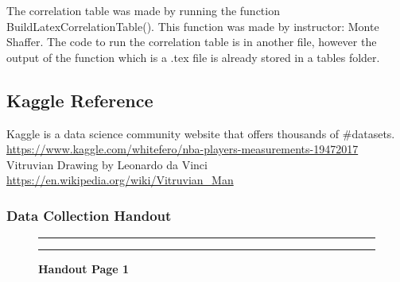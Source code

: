 \documentclass[]{article}
\begin{document}
The correlation table was made by running the function
BuildLatexCorrelationTable(). This function was made by instructor:
Monte Shaffer. The code to run the correlation table is in another file,
however the output of the function which is a .tex file is already
stored in a tables folder. \newline \newline

\subsection{Kaggle Reference}
\label{sec:References}

Kaggle is a data science community website that offers thousands of
\#datasets. \newline
\url{https://www.kaggle.com/whitefero/nba-players-measurements-19472017}
\newline \vspace{2.5mm} Vitruvian Drawing by Leonardo da Vinci \newline
\url{https://en.wikipedia.org/wiki/Vitruvian_Man}

\newpage
\subsubsection{Data Collection Handout}
\label{sec:appendix-data-handout}

\begin{figure}[!ht]
    \hrule
    \caption{ \textbf{Handout Page 1} }
    \begin{center}
    \end{center}
    \label{fig:handout-1}
    \hrule
\end{figure}
\end{document}
